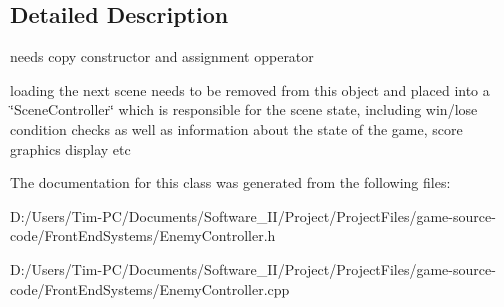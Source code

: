 \subsection{Detailed Description}
needs copy constructor and assignment opperator 

loading the next scene needs to be removed from this object and placed into a \char`\"{}\+Scene\+Controller\char`\"{} which is responsible for the scene state, including win/lose condition checks as well as information about the state of the game, score graphics display etc 

The documentation for this class was generated from the following files\+:\begin{DoxyCompactItemize}
\item 
D\+:/\+Users/\+Tim-\/\+P\+C/\+Documents/\+Software\+\_\+\+I\+I/\+Project/\+Project\+Files/game-\/source-\/code/\+Front\+End\+Systems/Enemy\+Controller.\+h\item 
D\+:/\+Users/\+Tim-\/\+P\+C/\+Documents/\+Software\+\_\+\+I\+I/\+Project/\+Project\+Files/game-\/source-\/code/\+Front\+End\+Systems/Enemy\+Controller.\+cpp\end{DoxyCompactItemize}
